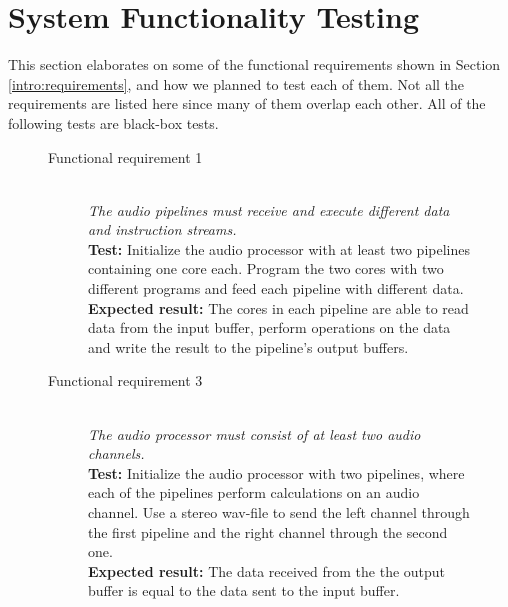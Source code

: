 
\section{System Functionality Testing}

This section elaborates on some of the functional requirements shown in Section
\ref{intro:requirements}, and how we planned to test each of them. Not all the
requirements are listed here since many of them overlap each other. All of the following tests are black-box tests.

\begin{figure}[H]
    \label{test:func-test1}
    \begin{description}
        \item[Functional requirement 1] \hfill \\
            \textit{The audio pipelines must receive and execute different data and instruction streams.} \\
            \textbf{Test:} Initialize the audio processor with at least two pipelines
            containing one core each. Program the two cores with two different programs and feed
            each pipeline with different data.\\
            \textbf{Expected result:} The cores in each pipeline are able to read data from the input buffer,
            perform operations on the data and write the result to the pipeline's output buffers.
    \end{description}
\end{figure}

\begin{figure}[H]
    \label{test:func-test3}
    \begin{description}
        \item[Functional requirement 3] \hfill \\
            \textit{The audio processor must consist of at least two audio channels.} \\
            \textbf{Test:} Initialize the audio processor with two pipelines, where each of the
            pipelines perform calculations on an audio channel. Use a stereo wav-file to send
            the left channel through the first pipeline and the right channel through the
            second one. \\
            \textbf{Expected result:} The data received from the the output buffer is equal to the
            data sent to the input buffer.
    \end{description}
\end{figure}

